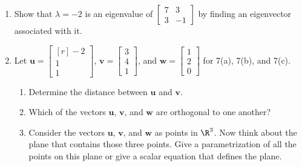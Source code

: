 \documentclass[basic]{inVerba-notes}
\begin{document}
\begin{enumerate}[align=left, leftmargin=0pt, labelindent=\parindent, listparindent=\parindent, labelwidth=0pt, itemindent=!]
  \item {} Show that \(\lambda=-2\) is an eigenvalue of \(\begin{bmatrix}7 & 3\\3 & -1\end{bmatrix}\) by finding an eigenvector associated with it.
  \basec{\[%
  \operatorname{N}\left(\begin{bmatrix} %
    7 \chap{-2} & 3 \\
    3 & -1 - \chap{-2} 
    \end{bmatrix}\right) = \str{\begin{bmatrix} -\tfrac{1}{3} \\ 1 \end{bmatrix}}
  \]}%
  
  
  \newpage

  \item  Let \(\bm{u}=\begin{bmatrix*}[r] -2 \\ 1 \\ 1 \end{bmatrix*}\),  \(\bm{v}=\begin{bmatrix} 3 \\ 4 \\ 1 \end{bmatrix}\), and \(\bm{w}=\begin{bmatrix} 1 \\ 2\\ 0 \end{bmatrix}\) for 7(a), 7(b), and 7(c).
  
    \begin{enumerate}
      \item {} Determine the distance between \(\bm{u}\) and \(\bm{v}\).
      \item {} Which of the vectors \(\bm{u}\), \(\bm{v}\), and \(\bm{w}\) are orthogonal to one another?
      \item {} Consider the vectors \(\bm{u}\), \(\bm{v}\), and \(\bm{w}\) as points in \(\R^3\). Now think about the plane that contains those three points. Give a parametrization of all the points on this plane or give a scalar equation that defines the plane.
      

\end{enumerate}
\end{enumerate}
\end{document}
